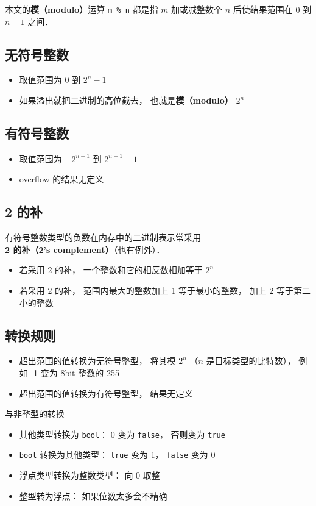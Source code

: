 
本文的\textbf{模（modulo）}运算 \verb|m % n| 都是指 $m$ 加或减整数个 $n$ 后使结果范围在 $0$ 到 $n-1$ 之间．

\subsection{无符号整数}
\begin{itemize}
\item 取值范围为 $0$ 到 $2^n-1$
\item 如果溢出就把二进制的高位截去， 也就是\textbf{模（modulo）} $2^n$
\end{itemize}

\subsection{有符号整数}
\begin{itemize}
\item 取值范围为 $-2^{n-1}$ 到 $2^{n-1}-1$
\item overflow 的结果无定义
\end{itemize}

\subsection{2 的补}
有符号整数类型的负数在内存中的二进制表示常采用 \textbf{2 的补（2's complement）}（也有例外）．
\begin{itemize}
\item 若采用 2 的补， 一个整数和它的相反数相加等于 $2^n$
\item 若采用 2 的补， 范围内最大的整数加上 1 等于最小的整数， 加上 2 等于第二小的整数
\end{itemize}

\subsection{转换规则}
\begin{itemize}
\item 超出范围的值转换为无符号整型， 将其模 $2^n$ （$n$ 是目标类型的比特数）， 例如 -1 变为 8bit 整数的 255
\item 超出范围的值转换为有符号整型， 结果无定义
\end{itemize}
与非整型的转换
\begin{itemize}
\item 其他类型转换为 \verb|bool|： 0 变为 \verb|false|， 否则变为 \verb|true|
\item \verb|bool| 转换为其他类型： \verb|true| 变为 1， \verb|false| 变为 0
\item 浮点类型转换为整数类型： 向 0 取整
\item 整型转为浮点： 如果位数太多会不精确
\end{itemize}

